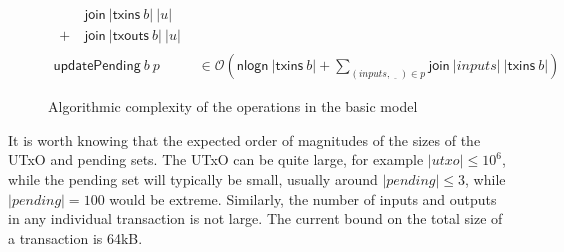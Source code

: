 \documentclass{article}
\newcommand{\order}[1]{\mathcal{O}\left(#1\right)}
\theoremstyle{definition}{
  \newtheorem{lemma}{Lemma}[section] %
  \newtheorem{definition}[lemma]{Definition}
}
\theoremstyle{theorem}{
  \newtheorem{invariant}[lemma]{Invariant}
  \newtheorem{proofobligation}[lemma]{Proof Obligation}
}
\numberwithin{equation}{lemma}
\begin{document}
\begin{figure}
\begin{equation*}
\begin{split}
{\begin{split}
                                & ~ \mathsf{join} ~ |\mathsf{txins}~ b| ~ |u| \\
                              + & ~ \mathsf{join} ~ |\mathsf{txouts}~ b| ~ |u|
                              \end{split}} \\
\mathsf{updatePending} ~ b ~ p & \in \order{\mathsf{nlogn} ~ |\mathsf{txins}~ b| + \sum_{(\mathit{inputs}, \,\underline{\phantom{a}}\,) \in p}{\mathsf{join} ~ |\mathit{inputs}| ~ |\mathsf{txins}~ b|}}
\end{split}
\end{equation*}
\caption{\label{fig:basic_model_complexity}Algorithmic complexity of the operations in the basic model}
\end{figure}

It is worth knowing that the expected
order of magnitudes of the sizes of the UTxO and pending sets. The UTxO can be
quite large, for example $|\mathit{utxo}| \leq 10^6$, while the pending set will
typically be small, usually around $|\mathit{pending}| \leq 3$, while $|\mathit{pending}| = 100$
would be extreme. Similarly, the number of inputs and outputs in any individual
transaction is not large. The current bound on the total size of a transaction
is 64kB.

\end{document}
